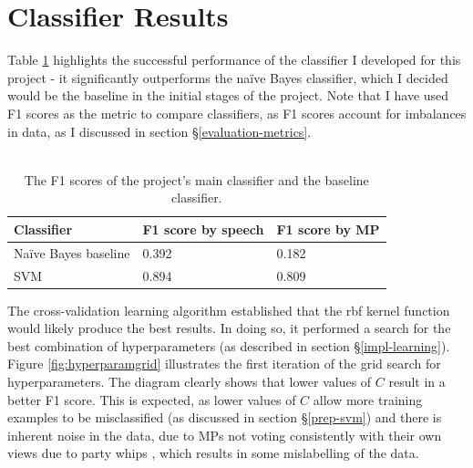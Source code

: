 \documentclass[12pt,a4paper,twoside,openright]{report}
\begin{document}
\section{Classifier Results} \label{eval-results}

Table \ref{table:results} highlights the successful performance of the classifier I developed for this project - it significantly outperforms the na\"{i}ve Bayes classifier, which I decided would be the baseline in the initial stages of the project. Note that I have used F1 scores as the metric to compare classifiers, as F1 scores account for imbalances in data, as I discussed in section \S\ref{evaluation-metrics}.
\\\\
\begin{table}[]
	\centering
	\begin{tabular}{lll}
		\hline
		\textbf{Classifier}      & \textbf{F1 score by speech} & \textbf{F1 score by MP} \\ \hline
		Na\"{i}ve Bayes baseline & 0.392                       & 0.182                   \\
		SVM                      & 0.894                       & 0.809                   \\ \hline
	\end{tabular}
	\caption{The F1 scores of the project's main classifier and the baseline classifier.}
	\label{table:results}	
\end{table}

The cross-validation learning algorithm established that the rbf kernel function would likely produce the best results. In doing so, it performed a search for the best combination of hyperparameters (as described in section \S\ref{impl-learning}). Figure \ref{fig:hyperparamgrid} illustrates the first iteration of the grid search for hyperparameters. The diagram clearly shows that lower values of $C$ result in a better F1 score. This is expected, as lower values of $C$ allow more training examples to be misclassified (as discussed in section \S\ref{prep-svm}) and there is inherent noise in the data, due to MPs not voting consistently with their own views due to party whips \cite{whips}, which results in some mislabelling of the data.
\\\\
\end{document}

